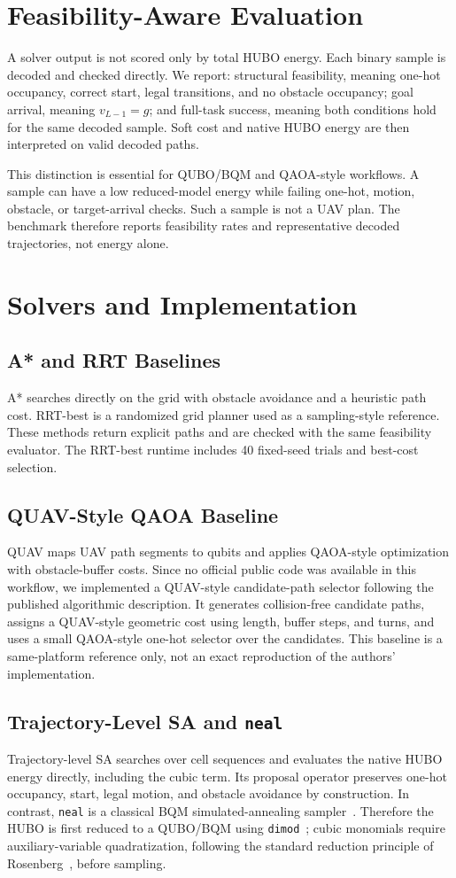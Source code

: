 \documentclass[10pt,conference]{IEEEtran}
\begin{document}
\section{Feasibility-Aware Evaluation}
A solver output is not scored only by total HUBO energy. Each binary sample is decoded and checked directly. We report: structural feasibility, meaning one-hot occupancy, correct start, legal transitions, and no obstacle occupancy; goal arrival, meaning $v_{L-1}=g$; and full-task success, meaning both conditions hold for the same decoded sample. Soft cost and native HUBO energy are then interpreted on valid decoded paths.

This distinction is essential for QUBO/BQM and QAOA-style workflows. A sample can have a low reduced-model energy while failing one-hot, motion, obstacle, or target-arrival checks. Such a sample is not a UAV plan. The benchmark therefore reports feasibility rates and representative decoded trajectories, not energy alone.

\section{Solvers and Implementation}
\subsection{A* and RRT Baselines}
A* searches directly on the grid with obstacle avoidance and a heuristic path cost. RRT-best is a randomized grid planner used as a sampling-style reference. These methods return explicit paths and are checked with the same feasibility evaluator. The RRT-best runtime includes 40 fixed-seed trials and best-cost selection.

\subsection{QUAV-Style QAOA Baseline}
QUAV maps UAV path segments to qubits and applies QAOA-style optimization with obstacle-buffer costs. Since no official public code was available in this workflow, we implemented a QUAV-style candidate-path selector following the published algorithmic description. It generates collision-free candidate paths, assigns a QUAV-style geometric cost using length, buffer steps, and turns, and uses a small QAOA-style one-hot selector over the candidates. This baseline is a same-platform reference only, not an exact reproduction of the authors' implementation.

\subsection{Trajectory-Level SA and \texttt{neal}}
Trajectory-level SA searches over cell sequences and evaluates the native HUBO energy directly, including the cubic term. Its proposal operator preserves one-hot occupancy, start, legal motion, and obstacle avoidance by construction. In contrast, \texttt{neal} is a classical BQM simulated-annealing sampler~\cite{neal}. Therefore the HUBO is first reduced to a QUBO/BQM using \texttt{dimod}~\cite{dimod}; cubic monomials require auxiliary-variable quadratization, following the standard reduction principle of Rosenberg~\cite{rosenberg1975}, before sampling.
\end{document}
